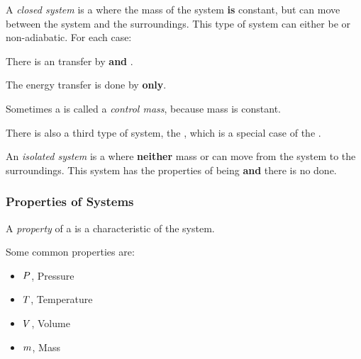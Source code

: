 \begin{definition}\label{def:Closed_System}
  A \emph{closed system} is a  where the mass of the system \textbf{is} constant, but  can move between the system and the surroundings.
  This type of system can either be  or non-adiabatic.
  For each case:
  \begin{description}[noitemsep]
  \item[\nameref{def:Adiabatic}] There is an  transfer by  \textbf{and} .
  \item[Non-adiabatic] The energy transfer is done by  \textbf{only}.
  \end{description}

  \begin{remark}\label{rmk:Control_Mass}
    Sometimes a  is called a \emph{control mass}, because mass is constant.
  \end{remark}
\end{definition}

There is also a third type of system, the , which is a special case of the .
\begin{definition}\label{def:Isolated_System}
  An \emph{isolated system} is a  where \textbf{neither} mass or  can move from the system to the surroundings.
  This system has the properties of being  \textbf{and} there is no  done.
\end{definition}

\subsubsection{Properties of Systems}\label{subsubsec:Properties_Systems}
\begin{definition}[Property]\label{def:Property}
  A \emph{property} of a  is a characteristic of the system.
\end{definition}

Some common properties are:
\begin{itemize}[noitemsep]
\item $P$, Pressure
\item $T$, Temperature
\item $V$, Volume
\item $m$, Mass
\end{itemize}

